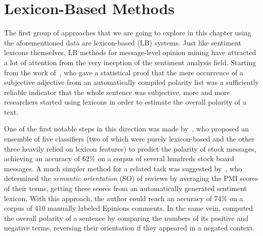 \section{Lexicon-Based Methods}\label{sec:cgsa:lexicon-based}

The first group of approaches that we are going to explore in this
chapter using the aforementioned data are lexicon-based (LB) systems.
Just like sentiment lexicons themselves, LB methods for message-level
opinion mining have attracted a lot of attention from the very
inception of the sentiment analysis field.  Starting from the work
of~\citet{Hatzivassi:00}, who gave a statistical proof that the mere
occurrence of a subjective adjective from an automatically compiled
polarity list was a sufficiently reliable indicator that the whole
sentence was subjective, more and more researchers started using
lexicons in order to estimate the overall polarity of a text.

One of the first notable steps in this direction was made
by~\citet{Das:01}, who proposed an ensemble of five classifiers (two
of which were purely lexicon-based and the other three heavily relied
on lexicon features) to predict the polarity of stock messages,
achieving an accuracy of 62\% on a corpus of several hundreds stock
board messages.  A much simpler method for a related task was
suggested by~\citet{Turney:02}, who determined the \emph{semantic
  orientation} (SO) of reviews by averaging the PMI scores of their
terms, getting these scores from an automatically generated sentiment
lexicon.  With this approach, the author could reach an accuracy of
74\% on a corpus of 410 manually labeled Epinions comments.  In the
same vein, \citet{Hu:04} computed the overall polarity of a sentence
by comparing the numbers of its positive and negative terms, reversing
their orientation if they appeared in a negated context.


